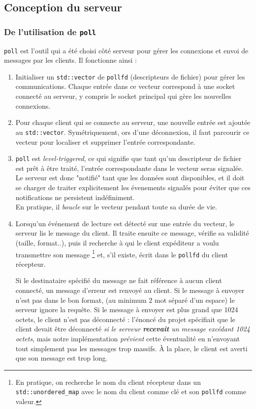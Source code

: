 \documentclass{article}
\begin{document}
\subsection{Conception du serveur}

\subsubsection{De l'utilisation de \texttt{poll}}
\noindent \texttt{poll} \cite{poll} est l'outil qui a été choisi côté serveur pour gérer les connexions et envoi de messages par les clients. Il fonctionne ainsi \cite{poll} :
\begin{enumerate}
    \item Initialiser un \texttt{std::vector} de \texttt{pollfd} (descripteurs de fichier) pour gérer les communications. Chaque entrée dans ce vecteur correspond à une socket connecté au serveur, y compris le socket principal qui gère les nouvelles connexions.
    \item Pour chaque client qui se connecte au serveur, une nouvelle entrée  est ajoutée au \texttt{std::vector}. Symétriquement, ors d'une déconnexion, il faut parcourir ce vecteur pour localiser et supprimer l'entrée correspondante.
    \item \texttt{poll} est \textit{level-triggered}, ce qui signifie que tant qu'un descripteur de fichier est prêt à être traité, l'entrée correspondante dans le vecteur seras signalée. Le serveur est donc "notifié" tant que les données sont disponibles, \cite{LevelEdgeTrigger} \cite{PollTrigger} et il doit se charger de traiter explicitement les évenements signalés pour éviter que ces notifications ne persistent indéfiniment.\\ En pratique, il \textit{boucle} sur le vecteur pendant toute sa durée de vie.
    \item Lorsqu’un événement de lecture est détecté sur une entrée du vecteur, le serveur lis le message du client. Il traite ensuite ce message, vérifie sa validité (taille, format..), puis il recherche à qui le client expéditeur a voulu transmettre son message \footnote{En pratique, on recherche le nom du client récepteur dans un \texttt{std::unordered\_map} avec le nom du client comme clé et son \texttt{pollfd} comme valeur.} et, s'il existe, écrit dans le \texttt{pollfd} du client récepteur.


    Si le destinataire spécifié du message ne fait référence à aucun client connecté, un message d'erreur est renvoyé au client.
    Si le message à envoyer n'est pas dans le bon format, (au minimum 2 mot séparé d'un espace) le serveur ignore la requête.
    Si le message à envoyer est plus grand que 1024 octets, le client n'est pas déconnecté : l'énoncé du projet spécifiait que le client devait être déconnecté \textit{si le serveur \textbf{recevait} un message excédant 1024 octets}, mais notre implémentation \textit{prévient} cette éventualité en n'envoyant tout simplement pas les messages trop massifs. À la place, le client est averti que son message est trop long.
\end{enumerate}
\end{document}

